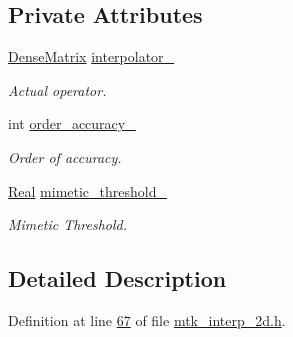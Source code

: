 \subsection*{Private Attributes}
\begin{DoxyCompactItemize}
\item 
\hyperlink{classmtk_1_1DenseMatrix}{Dense\+Matrix} \hyperlink{classmtk_1_1Interp2D_aa30fa30d96c8b0a37adac36c4e344329}{interpolator\+\_\+}
\begin{DoxyCompactList}\small\item\em Actual operator. \end{DoxyCompactList}\item 
int \hyperlink{classmtk_1_1Interp2D_ad83cea724e0eff1d8b14bcba3575612e}{order\+\_\+accuracy\+\_\+}
\begin{DoxyCompactList}\small\item\em Order of accuracy. \end{DoxyCompactList}\item 
\hyperlink{group__c01-roots_gac080bbbf5cbb5502c9f00405f894857d}{Real} \hyperlink{classmtk_1_1Interp2D_a842cfa59a56be76a240dd5de68007134}{mimetic\+\_\+threshold\+\_\+}
\begin{DoxyCompactList}\small\item\em Mimetic Threshold. \end{DoxyCompactList}\end{DoxyCompactItemize}


\subsection{Detailed Description}


Definition at line \hyperlink{mtk__interp__2d_8h_source_l00067}{67} of file \hyperlink{mtk__interp__2d_8h_source}{mtk\+\_\+interp\+\_\+2d.\+h}.



